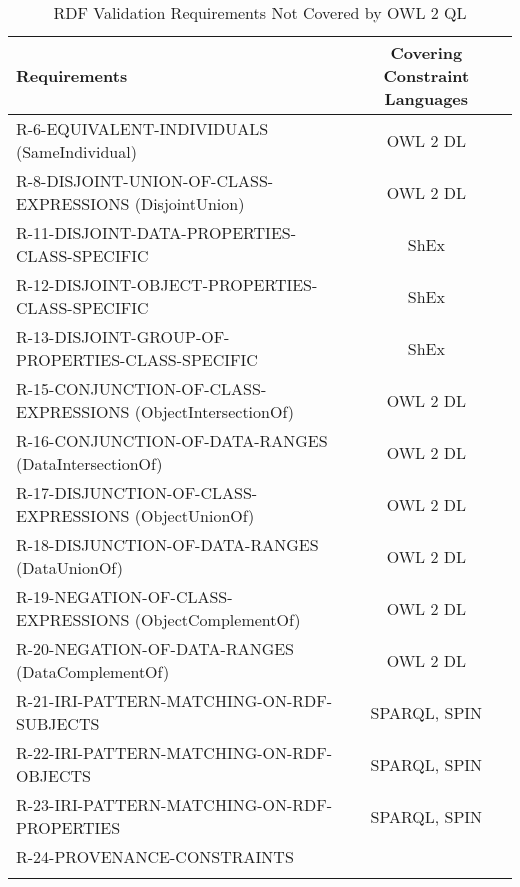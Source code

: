 \documentclass{llncs}
\newcommand{\hr}{\hline\noalign{\smallskip}} %
\begin{document}
\begin{table}
\caption{RDF Validation Requirements Not Covered by OWL 2 QL}
\label{tab:RequirementsNotCoveredOWL2QL}
\centering
\begin{tabular}{lc}
\hr
Requirements & Covering Constraint Languages \\
\hr
R-6-EQUIVALENT-INDIVIDUALS (SameIndividual) & OWL 2 DL \\
R-8-DISJOINT-UNION-OF-CLASS-EXPRESSIONS (DisjointUnion) & OWL 2 DL \\
R-11-DISJOINT-DATA-PROPERTIES-CLASS-SPECIFIC & ShEx \\
R-12-DISJOINT-OBJECT-PROPERTIES-CLASS-SPECIFIC & ShEx \\
R-13-DISJOINT-GROUP-OF-PROPERTIES-CLASS-SPECIFIC & ShEx \\
R-15-CONJUNCTION-OF-CLASS-EXPRESSIONS (ObjectIntersectionOf) & OWL 2 DL \\
R-16-CONJUNCTION-OF-DATA-RANGES (DataIntersectionOf) & OWL 2 DL \\
R-17-DISJUNCTION-OF-CLASS-EXPRESSIONS (ObjectUnionOf) & OWL 2 DL \\
R-18-DISJUNCTION-OF-DATA-RANGES (DataUnionOf) & OWL 2 DL \\
R-19-NEGATION-OF-CLASS-EXPRESSIONS (ObjectComplementOf) & OWL 2 DL \\
R-20-NEGATION-OF-DATA-RANGES (DataComplementOf) & OWL 2 DL \\
R-21-IRI-PATTERN-MATCHING-ON-RDF-SUBJECTS & SPARQL, SPIN \\
R-22-IRI-PATTERN-MATCHING-ON-RDF-OBJECTS & SPARQL, SPIN \\
R-23-IRI-PATTERN-MATCHING-ON-RDF-PROPERTIES & SPARQL, SPIN \\
R-24-PROVENANCE-CONSTRAINTS & \\
\hr
\end{tabular}
\end{table}

{}

\setcounter{tocdepth}{1}
\end{document}
